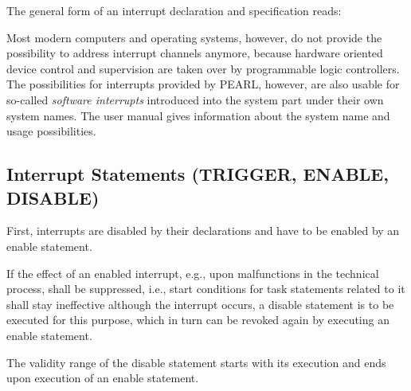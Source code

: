 The general form of an interrupt declaration and specification reads:





Most modern computers and operating systems, however, do not provide the
possibility to address interrupt channels anymore, because hardware
oriented device control and supervision are taken over by programmable
logic controllers. The possibilities for interrupts provided by PEARL,
however, are also usable for so-called {\em software interrupts}
introduced into the system part under their own system names. The user manual
gives information about the system name and usage possibilities.

\subsection{Interrupt Statements (TRIGGER, ENABLE, DISABLE)}    %

First, interrupts are disabled by their declarations and have to be
enabled by an enable statement.

If the effect of an enabled interrupt, e.g., upon malfunctions in the
technical process, shall be suppressed, i.e., start conditions for task
statements related to it shall stay ineffective although the interrupt
occurs, a disable statement is to be executed for this purpose, which
in turn can be revoked again by executing an enable statement.



The validity range of the disable statement starts with its
execution and ends upon execution of an enable statement.

